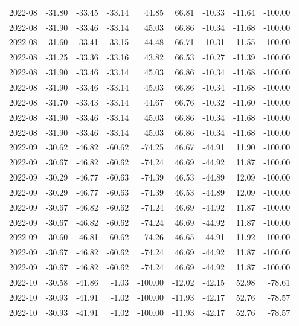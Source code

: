 \begin{table}[ht]
\begin{tabular}{lrrrrrrrr}
  2022-08 & -31.80 & -33.45 & -33.14 & 44.85 & 66.81 & -10.33 & -11.64 & -100.00 \\ 
  2022-08 & -31.90 & -33.46 & -33.14 & 45.03 & 66.86 & -10.34 & -11.68 & -100.00 \\ 
  2022-08 & -31.60 & -33.41 & -33.15 & 44.48 & 66.71 & -10.31 & -11.55 & -100.00 \\ 
  2022-08 & -31.25 & -33.36 & -33.16 & 43.82 & 66.53 & -10.27 & -11.39 & -100.00 \\ 
  2022-08 & -31.90 & -33.46 & -33.14 & 45.03 & 66.86 & -10.34 & -11.68 & -100.00 \\ 
  2022-08 & -31.90 & -33.46 & -33.14 & 45.03 & 66.86 & -10.34 & -11.68 & -100.00 \\ 
  2022-08 & -31.70 & -33.43 & -33.14 & 44.67 & 66.76 & -10.32 & -11.60 & -100.00 \\ 
  2022-08 & -31.90 & -33.46 & -33.14 & 45.03 & 66.86 & -10.34 & -11.68 & -100.00 \\ 
  2022-08 & -31.90 & -33.46 & -33.14 & 45.03 & 66.86 & -10.34 & -11.68 & -100.00 \\ 
  2022-09 & -30.62 & -46.82 & -60.62 & -74.25 & 46.67 & -44.91 & 11.90 & -100.00 \\ 
  2022-09 & -30.67 & -46.82 & -60.62 & -74.24 & 46.69 & -44.92 & 11.87 & -100.00 \\ 
  2022-09 & -30.29 & -46.77 & -60.63 & -74.39 & 46.53 & -44.89 & 12.09 & -100.00 \\ 
  2022-09 & -30.29 & -46.77 & -60.63 & -74.39 & 46.53 & -44.89 & 12.09 & -100.00 \\ 
  2022-09 & -30.67 & -46.82 & -60.62 & -74.24 & 46.69 & -44.92 & 11.87 & -100.00 \\ 
  2022-09 & -30.67 & -46.82 & -60.62 & -74.24 & 46.69 & -44.92 & 11.87 & -100.00 \\ 
  2022-09 & -30.60 & -46.81 & -60.62 & -74.26 & 46.65 & -44.91 & 11.92 & -100.00 \\ 
  2022-09 & -30.67 & -46.82 & -60.62 & -74.24 & 46.69 & -44.92 & 11.87 & -100.00 \\ 
  2022-09 & -30.67 & -46.82 & -60.62 & -74.24 & 46.69 & -44.92 & 11.87 & -100.00 \\ 
  2022-10 & -30.58 & -41.86 & -1.03 & -100.00 & -12.02 & -42.15 & 52.98 & -78.61 \\ 
  2022-10 & -30.93 & -41.91 & -1.02 & -100.00 & -11.93 & -42.17 & 52.76 & -78.57 \\ 
  2022-10 & -30.93 & -41.91 & -1.02 & -100.00 & -11.93 & -42.17 & 52.76 & -78.57 \\ 

\end{tabular}
\end{table}
